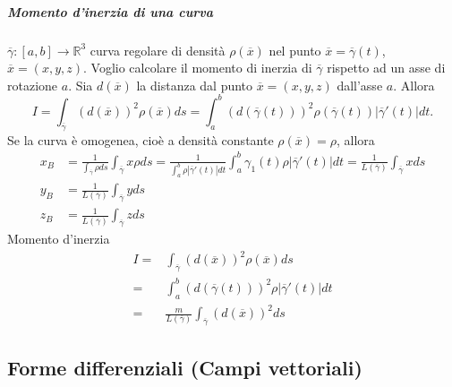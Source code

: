 \documentclass{article}
\newcommand{\R}{\mathbb{R}}
\begin{document}
\subparagraph{{\textbf{Momento d'inerzia di una curva}}}
$\overline{\gamma}:[a,b]\rightarrow \R^3$ curva regolare di densità $\rho(\overline{x}) $ nel punto $\overline{x}=\overline{\gamma}(t)$, $\overline{x}=(x,y,z)$. Voglio calcolare il momento di inerzia di $\overline{\gamma}$ rispetto ad un asse di rotazione $a$. Sia $d(\overline{x})$ la distanza dal punto $\overline{x}=(x,y,z)$ dall'asse $a$. Allora
\begin{equation*}
    I= \int_{\overline{\gamma}}(d(\overline{x}))^2 \rho(\overline{x})ds= \int_a^b (d(\overline{\gamma}(t)))^2 \rho (\overline{\gamma}(t))|\overline{\gamma}'(t)|dt.
\end{equation*}
Se la curva è omogenea, cioè a densità constante $\rho(\overline{x})=\rho$, allora 
\begin{align*}
    x_B&= \frac{1}{\int_{\overline{\gamma}}\rho ds}\int_{\overline{\gamma}}x \rho ds = \frac{1}{\int_a^b\rho|\overline{\gamma}'(t)|dt}\int_a^b \gamma_1 (t) \rho |\overline{\gamma}'(t)|dt= \frac{1}{L(\overline{\gamma})}\int_{\overline{\gamma}}x ds\\
    y_B&=\frac{1}{L(\overline{\gamma})}\int_{\overline{\gamma}}y ds\\
    z_B&= \frac{1}{L(\overline{\gamma})}\int_{\overline{\gamma}}z ds
\end{align*}
Momento d'inerzia
\begin{align*}
    I=& \int_{\overline{\gamma}}(d(\overline{x}))^2\rho(\overline{x})ds\\
    =& \int_a^b (d(\overline{\gamma}(t)))^2 \rho|\overline{\gamma}'(t)|dt\\
    =& \frac{m}{L(\overline{\gamma})}\int_{\overline{\gamma}}(d(\overline{x}))^2 ds
\end{align*}

\subsection{{Forme differenziali (Campi vettoriali)}}
\end{document}

